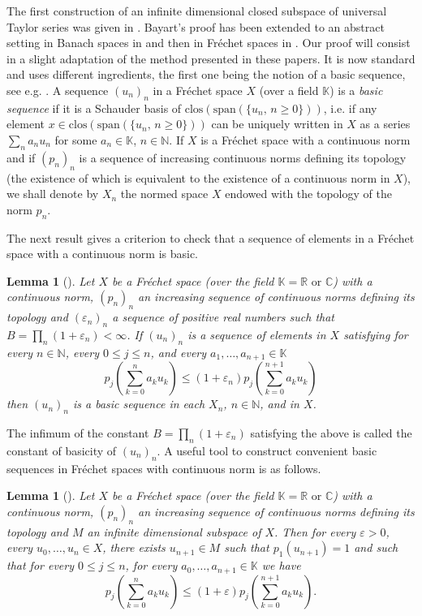 \documentclass[12pt]{amsart}
\numberwithin{equation}{section}
\newtheorem{lemma}[theorem]{Lemma}
\begin{document}
The first construction of an infinite dimensional closed subspace of universal Taylor series was given in \cite{Bay}. Bayart's proof has been extended to an abstract setting in Banach spaces in \cite{CH} and then in Fr\'echet spaces in \cite{Men}. Our proof will consist in a slight adaptation of the method presented in these papers.
It is now standard and uses different ingredients, the first one being
the notion of a basic sequence, see e.g. \cite{Men,Pet}. A sequence $\left(u_n\right)_n$ in a Fr\'echet space $X$ (over a field $\mathbb{K}$) is a \emph{basic sequence} if it is a Schauder basis of $\text{clos}(\text{span}(\{u_n,\,n\geq 0\}))$, i.e. if any element $x\in \text{clos}(\text{span}(\{u_n,\,n\geq 0\}))$ can be uniquely written in $X$ as a series $\sum_n a_nu_n$ for some $a_n\in \mathbb{K}$, $n\in {\mathbb{N}}$. If $X$ is a Fr\'echet space with a continuous norm and if $\left(p_n\right)_n$ is a sequence of increasing continuous norms defining its topology (the existence of which is equivalent to the existence of a continuous norm in $X$), we shall denote by $X_n$ the normed space $X$ endowed with the topology of the norm $p_n$.

The next result gives a criterion to check that a sequence of elements in a Fr\'echet space with a continuous norm is basic.

\begin{lemma}[{\cite[Lemme 2.2]{Men}}]
Let $X$ be a Fr\'echet space (over the field $\mathbb{K}={\mathbb{R}} \text{ or } {\mathbb{C}}$) with a continuous norm, $\left(p_n\right)_n$ an increasing sequence of continuous norms defining its topology and $\left(\varepsilon _n\right)_n$ a sequence of positive real numbers such that $B=\prod _n (1+\varepsilon _n)<\infty$. If $\left(u_n\right)_n$ is a sequence of elements in $X$ satisfying for every $n\in {\mathbb{N}}$, every $0\leq j\leq n$, and every $a_1,\ldots , a_{n+1} \in \mathbb{K}$
$$p_j\left(\sum_{k=0}^{n}a_ku_k\right)\leq (1+\varepsilon _n)p_j\left(\sum_{k=0}^{n+1}a_ku_k\right)$$
then $\left(u_n\right)_n$ is a basic sequence in each $X_n$, $n\in {\mathbb{N}}$, and in $X$.
\end{lemma}

The infimum of the constant $B=\prod _n (1+\varepsilon _n)$ satisfying the above is called the constant of basicity of $\left(u_n\right)_n$. A useful tool to construct convenient basic sequences in Fr\'echet spaces with continuous norm is as follows.

\begin{lemma}[{\cite[Lemme 2.3]{Men}}]\label{basic-sequence}Let $X$ be a Fr\'echet space (over the field $\mathbb{K}={\mathbb{R}} \text{ or } {\mathbb{C}}$) with a continuous norm, $\left(p_n\right)_n$ an increasing sequence of continuous norms defining its topology and $M$ an infinite dimensional subspace of $X$. Then for every $\varepsilon >0$, every $u_0,\ldots,u_n \in X$, there exists $u_{n+1}\in M$ such that $p_1\left(u_{n+1}\right)=1$ and such that for every $0\leq j\leq n$, for every $a_0,\ldots,a_{n+1} \in \mathbb{K}$ we have
$$p_j\left(\sum_{k=0}^{n}a_ku_k\right)\leq (1+\varepsilon)p_j\left(\sum_{k=0}^{n+1}a_ku_k\right).$$
\end{lemma}
\end{document}
